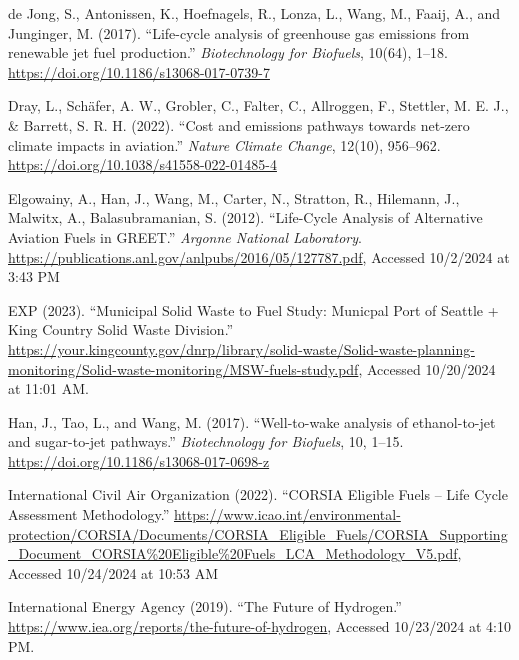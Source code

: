 \documentclass[12pt]{article}
\begin{document}
\begin{Appendix}
\begin{description}
    \item de Jong, S., Antonissen, K., Hoefnagels, R., Lonza, L., Wang, M., Faaij, A., and Junginger, M. (2017). “Life-cycle analysis of greenhouse gas emissions from renewable jet fuel production.” \textit{Biotechnology for Biofuels}, 10(64), 1–18. \url{https://doi.org/10.1186/s13068-017-0739-7}
    
    \item Dray, L., Schäfer, A. W., Grobler, C., Falter, C., Allroggen, F., Stettler, M. E. J., & Barrett, S. R. H. (2022). “Cost and emissions pathways towards net-zero climate impacts in aviation.” \textit{Nature Climate Change}, 12(10), 956–962. \url{https://doi.org/10.1038/s41558-022-01485-4}
    
    \item Elgowainy, A., Han, J., Wang, M., Carter, N., Stratton, R., Hilemann, J., Malwitx, A., Balasubramanian, S. (2012). “Life-Cycle Analysis of Alternative Aviation Fuels in GREET.” \textit{Argonne National Laboratory}. \url{https://publications.anl.gov/anlpubs/2016/05/127787.pdf}, Accessed 10/2/2024 at 3:43 PM
    \item
    EXP (2023). “Municipal Solid Waste to Fuel Study: Municpal Port of Seattle + King Country Solid Waste Division.” \url{https://your.kingcounty.gov/dnrp/library/solid-waste/Solid-waste-planning-monitoring/Solid-waste-monitoring/MSW-fuels-study.pdf}, Accessed 10/20/2024 at 11:01 AM.
    \item Han, J., Tao, L., and Wang, M. (2017). “Well-to-wake analysis of ethanol-to-jet and sugar-to-jet pathways.” \textit{Biotechnology for Biofuels}, 10, 1–15. \url{https://doi.org/10.1186/s13068-017-0698-z}
    
    \item International Civil Air Organization (2022). “CORSIA Eligible Fuels – Life Cycle Assessment Methodology.” \url{https://www.icao.int/environmental-protection/CORSIA/Documents/CORSIA_Eligible_Fuels/CORSIA_Supporting_Document_CORSIA%20Eligible%20Fuels_LCA_Methodology_V5.pdf}, Accessed 10/24/2024 at 10:53 AM
    
    \item International Energy Agency (2019). “The Future of Hydrogen.” \url{https://www.iea.org/reports/the-future-of-hydrogen}, Accessed 10/23/2024 at 4:10 PM.
\end{description}
\begin{description}
    \setlength{\itemsep}{0pt} %
    \small %


\end{description}
\end{Appendix}
\end{document}
